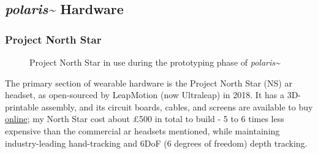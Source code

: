 \subsection{\textit{polaris\textasciitilde{}} Hardware}\label{sec: polaris-framework-hardware}
\subsubsection{Project North Star}\label{sec: polaris-framework-hardware-pns}

\begin{figure}
    \centering
    \hfill
    \caption{Project North Star in use during the prototyping phase of \textit{polaris\textasciitilde{}}}
\end{figure}

The primary section of wearable hardware is the Project North Star (NS) \ac{ar} headset, as open-sourced by LeapMotion (now Ultraleap) in 2018. It has a 3D-printable assembly, and its circuit boards, cables, and screens are available to buy \href{https://docs.projectnorthstar.org}{online}; my North Star cost about £500 in total to build - 5 to 6 times less expensive than the commercial \ac{ar} headsets mentioned, while maintaining industry-leading hand-tracking and 6DoF (6 degrees of freedom) depth tracking.

